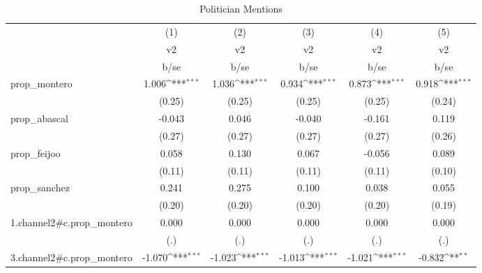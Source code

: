 \begin{table}[htbp]\centering
\def\sym#1{\ifmmode^{#1}\else\(^{#1}\)\fi}
\caption{Politician Mentions \label{table\_pol }}
\begin{tabular}{l*{5}{c}}
\toprule
            &\multicolumn{1}{c}{(1)}&\multicolumn{1}{c}{(2)}&\multicolumn{1}{c}{(3)}&\multicolumn{1}{c}{(4)}&\multicolumn{1}{c}{(5)}\\
            &\multicolumn{1}{c}{v2}&\multicolumn{1}{c}{v2}&\multicolumn{1}{c}{v2}&\multicolumn{1}{c}{v2}&\multicolumn{1}{c}{v2}\\
            &        b/se         &        b/se         &        b/se         &        b/se         &        b/se         \\
\midrule
prop\_montero&       1.006\sym{***}&       1.036\sym{***}&       0.934\sym{***}&       0.873\sym{***}&       0.918\sym{***}\\
            &      (0.25)         &      (0.25)         &      (0.25)         &      (0.25)         &      (0.24)         \\
prop\_abascal&      -0.043         &       0.046         &      -0.040         &      -0.161         &       0.119         \\
            &      (0.27)         &      (0.27)         &      (0.27)         &      (0.27)         &      (0.26)         \\
prop\_feijoo &       0.058         &       0.130         &       0.067         &      -0.056         &       0.089         \\
            &      (0.11)         &      (0.11)         &      (0.11)         &      (0.11)         &      (0.10)         \\
prop\_sanchez&       0.241         &       0.275         &       0.100         &       0.038         &       0.055         \\
            &      (0.20)         &      (0.20)         &      (0.20)         &      (0.20)         &      (0.19)         \\
1.channel2#c.prop\_montero&       0.000         &       0.000         &       0.000         &       0.000         &       0.000         \\
            &         (.)         &         (.)         &         (.)         &         (.)         &         (.)         \\
3.channel2#c.prop\_montero&      -1.070\sym{***}&      -1.023\sym{***}&      -1.013\sym{***}&      -1.021\sym{***}&      -0.832\sym{**} \\

\end{tabular}
\end{table}
